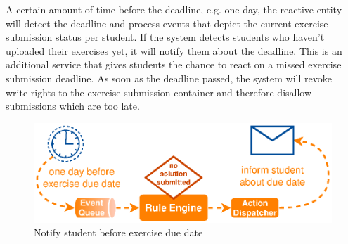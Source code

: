 A certain amount of time before the deadline, e.g. one day, the reactive entity will detect the deadline and process events that depict the current exercise submission status per student.
If the system detects students who haven't uploaded their exercises yet, it will notify them about the deadline.
This is an additional service that gives students the chance to react on a missed exercise submission deadline.
As soon as the deadline passed, the system will revoke write-rights to the exercise submission container and therefore disallow submissions which are too late.
\begin{figure}[!ht]
  \centering
  \includegraphics{figures/ProBinderExerciseNotification}
  \caption{Notify student before exercise due date}
  \label{fig:ProBinderExerciseNotification}
\end{figure}



